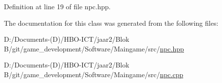 Definition at line 19 of file npc.\+hpp.



The documentation for this class was generated from the following files\+:\begin{DoxyCompactItemize}
\item 
D\+:/\+Documents-\/(\+D)/\+H\+B\+O-\/\+I\+C\+T/jaar2/\+Blok B/git/game\+\_\+development/\+Software/\+Maingame/src/\hyperlink{npc_8hpp}{npc.\+hpp}\item 
D\+:/\+Documents-\/(\+D)/\+H\+B\+O-\/\+I\+C\+T/jaar2/\+Blok B/git/game\+\_\+development/\+Software/\+Maingame/src/\hyperlink{npc_8cpp}{npc.\+cpp}\end{DoxyCompactItemize}
